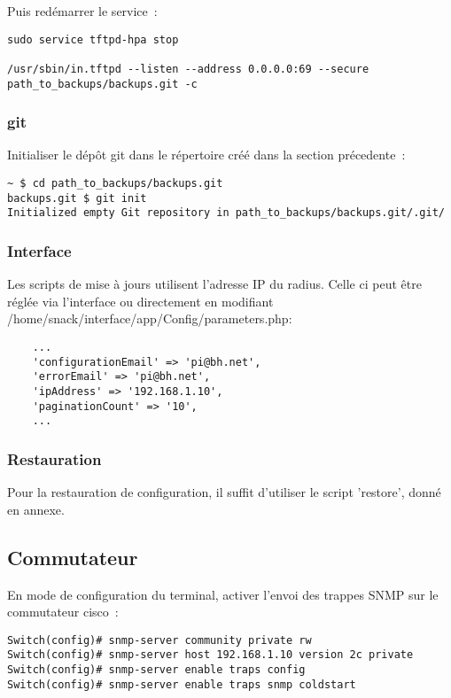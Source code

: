 Puis redémarrer le service~:
\begin{lstlisting}
sudo service tftpd-hpa stop

/usr/sbin/in.tftpd --listen --address 0.0.0.0:69 --secure path_to_backups/backups.git -c
\end{lstlisting}

\subsubsection{git}

Initialiser le dépôt git dans le répertoire créé dans la section précedente~:

\begin{lstlisting}
~ $ cd path_to_backups/backups.git
backups.git $ git init
Initialized empty Git repository in path_to_backups/backups.git/.git/
\end{lstlisting}


\subsubsection{Interface}

Les scripts de mise à jours utilisent l'adresse IP du radius. Celle ci peut être réglée via l'interface ou directement en modifiant /home/snack/interface/app/Config/parameters.php:
\begin{lstlisting}
    ...
    'configurationEmail' => 'pi@bh.net',
    'errorEmail' => 'pi@bh.net',
    'ipAddress' => '192.168.1.10',
    'paginationCount' => '10',
    ...
\end{lstlisting}

\subsubsection{Restauration}
Pour la restauration de configuration, il suffit d'utiliser le script 'restore', donné en annexe.


\subsection{Commutateur}

En mode de configuration du terminal, activer l'envoi des trappes SNMP sur le commutateur cisco~:

\begin{lstlisting}
Switch(config)# snmp-server community private rw
Switch(config)# snmp-server host 192.168.1.10 version 2c private
Switch(config)# snmp-server enable traps config
Switch(config)# snmp-server enable traps snmp coldstart
\end{lstlisting}


